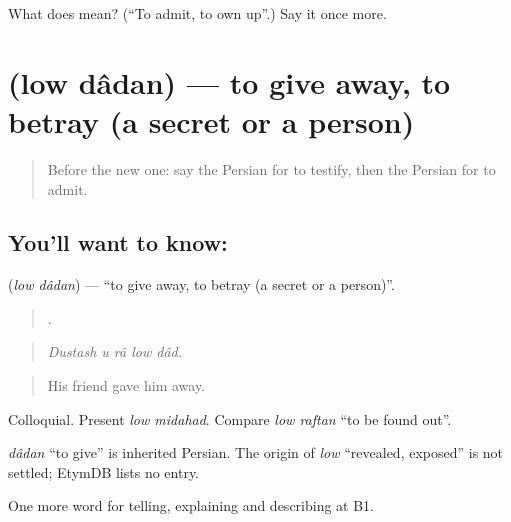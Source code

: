 \begin{tcolorbox}[breakable,colback=teal!4,colframe=teal!35!black,title={Before you move on}]
What does   mean? (\textquotedblleft{}To admit, to own up\textquotedblright{}.) Say it once more.
\end{tcolorbox}
\section[\texorpdfstring{\fa{لو} \fa{دادن} (low dâdan)}{لو دادن (low dâdan)}]{  (low dâdan) — to give away, to betray (a secret or a person)}

\label{lesson:FA-C321-low-dadan}



\begin{quote}
Before the new one: say the Persian for to testify, then the Persian for to admit.
\end{quote}

\subsection*{You'll want to know:  }
\textbf{ } (\emph{low dâdan}) — \textquotedblleft{}to give away, to betray (a secret or a person)\textquotedblright{}.

\begin{quote}
    .
\end{quote}

\begin{quote}
\emph{Dustash u râ low dâd.}
\end{quote}

\begin{quote}
His friend gave him away.
\end{quote}

Colloquial. Present \emph{low midahad}. Compare \emph{low raftan} \textquotedblleft{}to be found out\textquotedblright{}.

\begin{cousinweb}
\emph{dâdan} \textquotedblleft{}to give\textquotedblright{} is inherited Persian. The origin of \emph{low} \textquotedblleft{}revealed, exposed\textquotedblright{} is not settled; EtymDB lists no entry.
\end{cousinweb}

\begin{grammarlens}[title={What you've built}]
One more word for telling, explaining and describing at B1.
\end{grammarlens}

